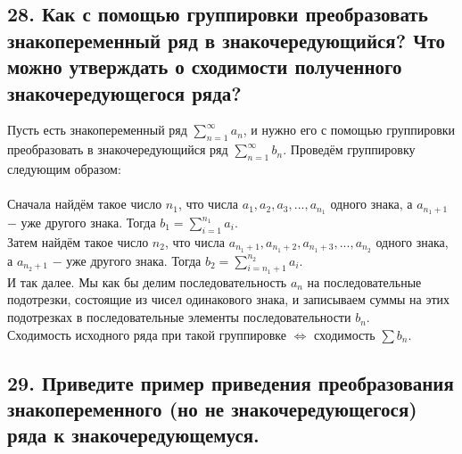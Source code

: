 \documentclass[a4paper, fleqn]{article}
\begin{document}
    \subsection*{28. Как с помощью группировки преобразовать знакопеременный ряд в знакочередующийся? Что можно утверждать о сходимости полученного знакочередующегося ряда?}
    Пусть есть знакопеременный ряд $\sum\limits_{n = 1}^{\infty} a_n$, и нужно его с помощью группировки преобразовать в знакочередующийся ряд $\sum\limits_{n = 1}^{\infty} b_n$. Проведём группировку следующим образом: \\ \\
    Сначала найдём такое число $n_1$, что числа $a_1, a_2, a_3, ..., a_{n_1}$ одного знака, а $a_{n_1 + 1}$ $-$ уже другого знака. Тогда $b_1 = \sum\limits_{i = 1}^{n_1} a_i$. \\
    Затем найдём такое число $n_2$, что числа $a_{n_1 + 1}, a_{n_1 + 2}, a_{n_1 + 3}, ..., a_{n_2}$ одного знака, а $a_{n_2 + 1}$ $-$ уже другого знака. Тогда $b_2 = \sum\limits_{i = n_1 + 1}^{n_2} a_i$. \\
    И так далее. Мы как бы делим последовательность $a_n$ на последовательные подотрезки, состоящие из чисел одинакового знака, и записываем суммы на этих подотрезках в последовательные элементы последовательности $b_n$. \\
    Сходимость исходного ряда при такой группировке $\Longleftrightarrow$ сходимость $\sum b_n$. \\
        
     \subsection*{29. Приведите пример приведения преобразования знакопеременного
    (но не знакочередующегося) ряда к знакочередующемуся.}
\end{document}
